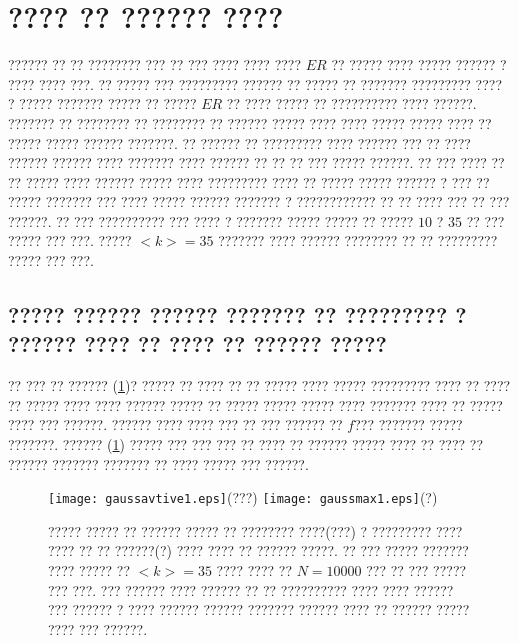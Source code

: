 \section{???? ?? ?????? ????}
?????? ?? ?? ???????? ??? ?? ??? ???? ???? ???? $ER$ ?? ????? ???? ????? ?????? ? ???? ???? ???. ?? ????? ??? ????????? ?????? ?? ????? ?? ??????? ????????? ???? ? ????? ??????? ????? ?? ????? $ER$ ?? ???? ????? ?? ?????????? ???? ??????. ??????? ?? ???????? ?? ???????? ??  ??????  ????? ????  ????   ????? ????? ???? ?? ????? ????? ?????? ???????. ?? ?????? ??  ????????? ???? ??????  ??? ?? ???? ?????? ??????  ???? ??????? ???? ?????? ?? ?? ?? ???  ????? ??????. ?? ??? ???? ?? ?? ????? ???? ?????? ????? ???? ????????? ???? ?? ?????  ????? ?????? ? ???  ?? ?????  ??????? ??? ???? ????? ?????? ??????? ? ???????????? ?? ?? ???? ??? ?? ??? ??????. ?? ??? ?????????? ??? ???? ?  ???????  ????? ????? ?? ????? $10$ ? $35 $ ?? ??? ????? ??? ???. ????? $<k> = 35$  ??????? ???? ?????? ???????? ?? ?? ????????? ????? ??? ???.

\subsection{????? ?????? ?????? ??????? ?? ????????? ? ?????? ???? ?? ???? ?? ?????? ?????}


 ?? ??? ?? ?????? (\ref{fig:gaussian})? ????? ?? ???? ?? ??  ????? ???? ?????  ????????? ???? ?? ???? ?? ????? ???? ???? ??????  ????? ?? ????? ????? ????? ???? ??????? ???? ?? ????? ???? ??? ??????. ?????? ???? ???? ??? ?? ??? ?????? ?? $f$??? ??????? ????? ???????.  
 ?????? (\ref{fig:gaussian}) ????? ??? ??? ??? ?? ???? ?? ?????? ????? ???? ?? ???? ?? ?????? ??????? ??????? ?? ???? ????? ??? ??????. 
\begin{figure}[htbp]
\hspace*{0cm}
\texttt{[image: gaussavtive1.eps]}\centering(???)
\texttt{[image: gaussmax1.eps]}\centering(?)
\caption [?????? ????? ?? ???????? ???? ? ????????? ???? ???? ?? ?? ?????? ???? ????  ?? ?????? ?????]{\footnotesize ????? ????? ??
 ?????? ????? ?? ???????? ????(???) ? ????????? ???? ???? ?? ?? ??????(?) ???? ????  ?? ?????? ?????.  ?? ??? ????? ??????? ???? ????? ?? $<k>  = 35$
 ???? ???? ?? $N = 10000$ ??? ?? ??? ????? ??? ???. ??? ?????? ???? ?????? ?? ?? ?????????? ???? ???? ?????? ??? ?????? ? ???? ?????? ?????? ??????? ?????? ???? ?? ?????? ????? ???? ??? ??????.}
\label{fig:gaussian}
\end{figure}
 
